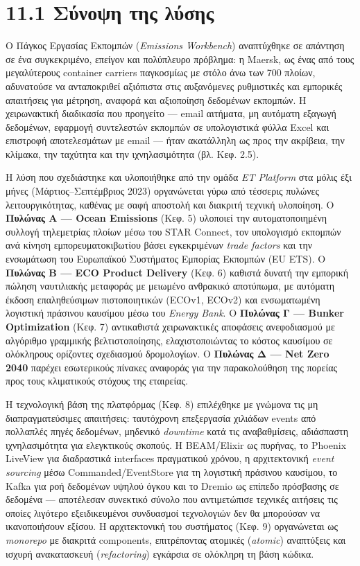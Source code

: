 \section{11.1 Σύνοψη της
λύσης}\label{ux3c3ux3cdux3bdux3bfux3c8ux3b7-ux3c4ux3b7ux3c2-ux3bbux3cdux3c3ux3b7ux3c2}

Ο Πάγκος Εργασίας Εκπομπών (\emph{Emissions Workbench}) αναπτύχθηκε σε
απάντηση σε ένα συγκεκριμένο, επείγον και πολύπλευρο πρόβλημα: η Maersk,
ως ένας από τους μεγαλύτερους container carriers παγκοσμίως με στόλο άνω
των 700 πλοίων, αδυνατούσε να ανταποκριθεί αξιόπιστα στις αυξανόμενες
ρυθμιστικές και εμπορικές απαιτήσεις για μέτρηση, αναφορά και αξιοποίηση
δεδομένων εκπομπών. Η χειρωνακτική διαδικασία που προηγείτο --- email
αιτήματα, μη αυτόματη εξαγωγή δεδομένων, εφαρμογή συντελεστών εκπομπών
σε υπολογιστικά φύλλα Excel και επιστροφή αποτελεσμάτων με email ---
ήταν ακατάλληλη ως προς την ακρίβεια, την κλίμακα, την ταχύτητα και την
ιχνηλασιμότητα (βλ. Κεφ. 2.5).

Η λύση που σχεδιάστηκε και υλοποιήθηκε από την ομάδα \emph{ET Platform}
στα μόλις έξι μήνες (Μάρτιος--Σεπτέμβριος 2023) οργανώνεται γύρω από
τέσσερις πυλώνες λειτουργικότητας, καθένας με σαφή αποστολή και διακριτή
τεχνική υλοποίηση. Ο \textbf{Πυλώνας Α --- Ocean Emissions} (Κεφ. 5)
υλοποιεί την αυτοματοποιημένη συλλογή τηλεμετρίας πλοίων μέσω του STAR
Connect, τον υπολογισμό εκπομπών ανά κίνηση εμπορευματοκιβωτίου βάσει
εγκεκριμένων \emph{trade factors} και την ενσωμάτωση του Ευρωπαϊκού
Συστήματος Εμπορίας Εκπομπών (EU ETS). Ο \textbf{Πυλώνας Β --- ECO
Product Delivery} (Κεφ. 6) καθιστά δυνατή την εμπορική πώληση
ναυτιλιακής μεταφοράς με μειωμένο ανθρακικό αποτύπωμα, με αυτόματη
έκδοση επαληθεύσιμων πιστοποιητικών (ECOv1, ECOv2) και ενσωματωμένη
λογιστική πράσινου καυσίμου μέσω του \emph{Energy Bank}. Ο
\textbf{Πυλώνας Γ --- Bunker Optimization} (Κεφ. 7) αντικαθιστά
χειρωνακτικές αποφάσεις ανεφοδιασμού με αλγόριθμο γραμμικής
βελτιστοποίησης, ελαχιστοποιώντας το κόστος καυσίμου σε ολόκληρους
ορίζοντες σχεδιασμού δρομολογίων. Ο \textbf{Πυλώνας Δ --- Net Zero 2040}
παρέχει εσωτερικούς πίνακες αναφοράς για την παρακολούθηση της πορείας
προς τους κλιματικούς στόχους της εταιρείας.

Η τεχνολογική βάση της πλατφόρμας (Κεφ. 8) επιλέχθηκε με γνώμονα τις μη
διαπραγματεύσιμες απαιτήσεις: ταυτόχρονη επεξεργασία χιλιάδων events από
πολλαπλές πηγές δεδομένων, μηδενικό \emph{downtime} κατά τις
αναβαθμίσεις, αδιάσπαστη ιχνηλασιμότητα για ελεγκτικούς σκοπούς. Η
BEAM/Elixir ως πυρήνας, το Phoenix LiveView για διαδραστικά interfaces
πραγματικού χρόνου, η αρχιτεκτονική \emph{event sourcing} μέσω
Commanded/EventStore για τη λογιστική πράσινου καυσίμου, το Kafka για
ροή δεδομένων υψηλού όγκου και το Dremio ως επίπεδο πρόσβασης σε
δεδομένα --- αποτέλεσαν συνεκτικό σύνολο που αντιμετώπισε τεχνικές
αιτήσεις τις οποίες λιγότερο εξειδικευμένοι συνδυασμοί τεχνολογιών δεν
θα μπορούσαν να ικανοποιήσουν εξίσου. Η αρχιτεκτονική του συστήματος
(Κεφ. 9) οργανώνεται ως \emph{monorepo} με διακριτά components,
επιτρέποντας ατομικές (\emph{atomic}) αναπτύξεις και ισχυρή ανακατασκευή
(\emph{refactoring}) εγκάρσια σε ολόκληρη τη βάση κώδικα.

